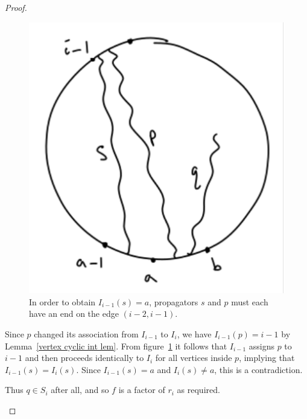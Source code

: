 \documentclass[11pt]{article}
\newcommand{\note}{\todo[color=green!40]}
\theoremstyle{remark}
\theoremstyle{definition}
\begin{document}
\begin{proof}
\begin{enumerate}
\begin{figure}
  \includegraphics[scale=0.5]{part4}
  \caption{In order to obtain $I_{i-1}(s) = a$, propagators $s$ and $p$ must each have an end on the edge $(i-2,i-1)$.}\label{fig part 4}
\end{figure}

Since $p$ changed its association from $I_{i-1}$ to $I_i$, we have $I_{i-1}(p) = i-1$ by Lemma~\ref{vertex cyclic int lem}. From figure~\ref{fig part 4} it follows that $I_{i-1}$ assigns $p$ to $i-1$ and then proceeds identically to $I_i$ for all vertices inside $p$, implying that $I_{i-1}(s) = I_i(s)$. Since $I_{i-1}(s) = a$ and $I_i(s) \neq a$, this is a contradiction. 

Thus $q\in S_i$ after all, and so $f$ is a factor of $r_i$ as required.

  




\end{enumerate}
\end{proof}
\end{document}
